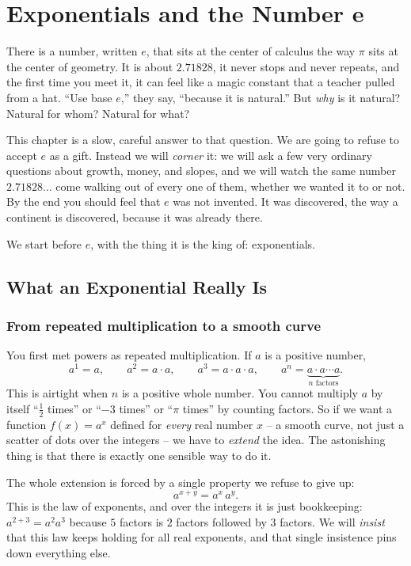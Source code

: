 \chapter{Exponentials and the Number e}

There is a number, written $e$, that sits at the center of calculus the way $\pi$ sits at the center of geometry. It is about $2.71828$, it never stops and never repeats, and the first time you meet it, it can feel like a magic constant that a teacher pulled from a hat. ``Use base $e$,'' they say, ``because it is natural.'' But \emph{why} is it natural? Natural for whom? Natural for what?

This chapter is a slow, careful answer to that question. We are going to refuse to accept $e$ as a gift. Instead we will \emph{corner} it: we will ask a few very ordinary questions about growth, money, and slopes, and we will watch the same number $2.71828\ldots$ come walking out of every one of them, whether we wanted it to or not. By the end you should feel that $e$ was not invented. It was discovered, the way a continent is discovered, because it was already there.

We start before $e$, with the thing it is the king of: exponentials.

\section{What an Exponential Really Is}

\subsection{From repeated multiplication to a smooth curve}

You first met powers as repeated multiplication. If $a$ is a positive number,
\[
a^1 = a, \qquad a^2 = a\cdot a, \qquad a^3 = a\cdot a\cdot a, \qquad a^n = \underbrace{a\cdot a\cdots a}_{n\text{ factors}}.
\]
This is airtight when $n$ is a positive whole number. You cannot multiply $a$ by itself ``$\tfrac{1}{2}$ times'' or ``$-3$ times'' or ``$\pi$ times'' by counting factors. So if we want a function $f(x)=a^x$ defined for \emph{every} real number $x$ -- a smooth curve, not just a scatter of dots over the integers -- we have to \emph{extend} the idea. The astonishing thing is that there is exactly one sensible way to do it.

The whole extension is forced by a single property we refuse to give up:
\begin{equation}
a^{x+y} = a^x \, a^y. \label{ch03:law}
\end{equation}
This is the law of exponents, and over the integers it is just bookkeeping: $a^{2+3}=a^2 a^3$ because $5$ factors is $2$ factors followed by $3$ factors. We will \emph{insist} that this law keeps holding for all real exponents, and that single insistence pins down everything else.

